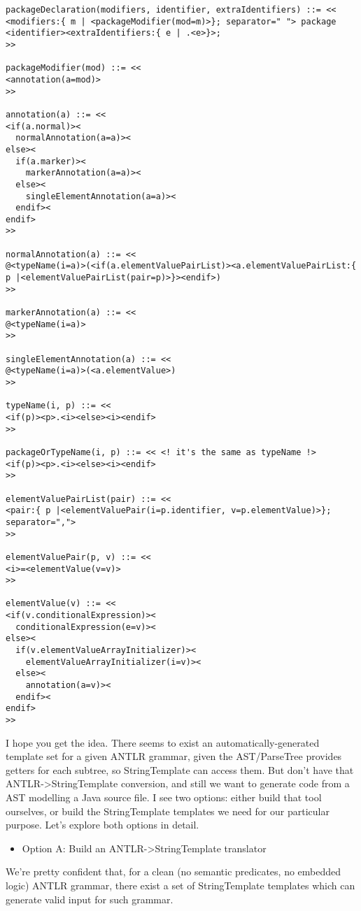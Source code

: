 \documentclass[11pt]{article}
\begin{document}
\begin{verbatim}
packageDeclaration(modifiers, identifier, extraIdentifiers) ::= <<
<modifiers:{ m | <packageModifier(mod=m)>}; separator=" "> package <identifier><extraIdentifiers:{ e | .<e>}>;
>>

packageModifier(mod) ::= <<
<annotation(a=mod)>
>>

annotation(a) ::= <<
<if(a.normal)><
  normalAnnotation(a=a)><
else><
  if(a.marker)><
    markerAnnotation(a=a)><
  else><
    singleElementAnnotation(a=a)><
  endif><
endif>
>>

normalAnnotation(a) ::= <<
@<typeName(i=a)>(<if(a.elementValuePairList)><a.elementValuePairList:{ p |<elementValuePairList(pair=p)>}><endif>)
>>

markerAnnotation(a) ::= <<
@<typeName(i=a)>
>>

singleElementAnnotation(a) ::= <<
@<typeName(i=a)>(<a.elementValue>)
>>

typeName(i, p) ::= <<
<if(p)><p>.<i><else><i><endif>
>>

packageOrTypeName(i, p) ::= << <! it's the same as typeName !>
<if(p)><p>.<i><else><i><endif>
>>

elementValuePairList(pair) ::= <<
<pair:{ p |<elementValuePair(i=p.identifier, v=p.elementValue)>}; separator=",">
>>

elementValuePair(p, v) ::= <<
<i>=<elementValue(v=v)>
>>

elementValue(v) ::= <<
<if(v.conditionalExpression)><
  conditionalExpression(e=v)><
else><
  if(v.elementValueArrayInitializer)><
    elementValueArrayInitializer(i=v)><
  else><
    annotation(a=v)><
  endif><
endif>
>>
\end{verbatim}

I hope you get the idea. There seems to exist an automatically-generated template set for a given ANTLR grammar, given the AST/ParseTree
provides getters for each subtree, so StringTemplate can access them.
But don't have that ANTLR->StringTemplate conversion, and still we want to generate code from a AST modelling a Java source file.
I see two options: either build that tool ourselves, or build the StringTemplate templates we need for our particular purpose.
Let's explore both options in detail.

\begin{itemize}
\item Option A: Build an ANTLR->StringTemplate translator
\end{itemize}

We're pretty confident that, for a clean (no semantic predicates, no embedded logic) ANTLR grammar, there exist a
set of StringTemplate templates which can generate valid input for such grammar.
\end{document}
